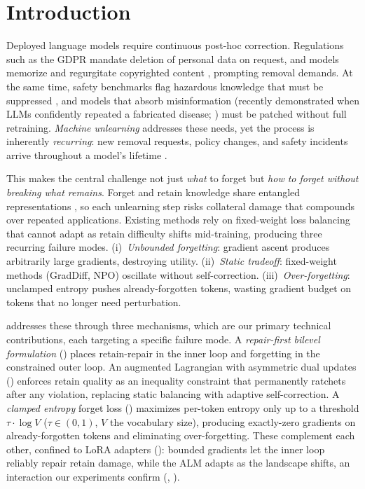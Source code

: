 \section{Introduction}
\label{sec:introduction}

Deployed language models require continuous post-hoc correction.
Regulations such as the GDPR \citep{voigt2017gdpr} mandate deletion of personal data on request, and models memorize and regurgitate copyrighted content \citep{carlini2021extracting}, prompting removal demands.
At the same time, safety benchmarks flag hazardous knowledge that must be suppressed \citep{li2024wmdp}, and models that absorb misinformation (recently demonstrated when LLMs confidently repeated a fabricated disease; \citealt{bixonimania}) must be patched without full retraining.
\emph{Machine unlearning} addresses these needs, yet the process is inherently \emph{recurring}: new removal requests, policy changes, and safety incidents arrive throughout a model's lifetime \citep{liu2025rethinking}.

This makes the central challenge not just \emph{what} to forget but \emph{how to forget without breaking what remains}.
Forget and retain knowledge share entangled representations \citep{cheng2026unlearning}, so each unlearning step risks collateral damage that compounds over repeated applications.
Existing methods rely on fixed-weight loss balancing \citep{liu2025rethinking, zhang2024negative} that cannot adapt as retain difficulty shifts mid-training, producing three recurring failure modes.
(i)~\emph{Unbounded forgetting}: gradient ascent \citep{jang2023knowledge} produces arbitrarily large gradients, destroying utility.
(ii)~\emph{Static tradeoff}: fixed-weight methods (GradDiff, NPO) oscillate without self-correction.
(iii)~\emph{Over-forgetting}: unclamped entropy \citep{yuan2025closer} pushes already-forgotten tokens, wasting gradient budget on tokens that no longer need perturbation.

\method addresses these through three mechanisms, which are our primary technical contributions, each targeting a specific failure mode.
A \emph{repair-first bilevel formulation} () places retain-repair in the inner loop and forgetting in the constrained outer loop.
An augmented Lagrangian with asymmetric dual updates () enforces retain quality as an inequality constraint that permanently ratchets after any violation, replacing static balancing with adaptive self-correction.
A \emph{clamped entropy} forget loss () maximizes per-token entropy only up to a threshold $\tau \cdot \log V$ ($\tau\!\in\!(0,1)$, $V$ the vocabulary size), producing exactly-zero gradients on already-forgotten tokens and eliminating over-forgetting.
These complement each other, confined to LoRA adapters (): bounded gradients let the inner loop reliably repair retain damage, while the ALM adapts as the landscape shifts, an interaction our experiments confirm (, ).

